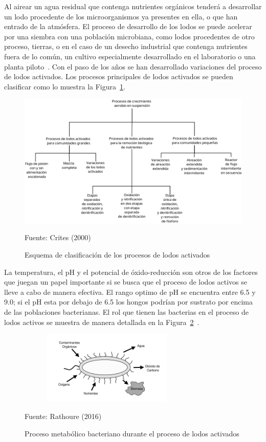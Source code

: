 Al airear un agua residual que contenga nutrientes orgánicos tenderá a desarrollar un lodo procedente de los microorganismos ya presentes en ella, o que han entrado de la atmósfera. El proceso de desarrollo de los lodos se puede acelerar por una siembra con una población microbiana, como lodos procedentes de otro proceso, tierras, o en el caso de un desecho industrial que contenga nutrientes fuera de lo común, un cultivo especialmente desarrollado en el laboratorio o una planta piloto~\emph{\citep{winkler96}}.
Con el paso de los años se han desarrollado variaciones del proceso de lodos activados. Los procesos principales de lodos activados se pueden clasificar como lo muestra la Figura~\ref{fig:procesosaer}.\\
	\begin{figure}[!h]
		\centering
		\includegraphics[scale=0.2]{Clasificacion_procesos_aer.png}
		\caption{Esquema de clasificación de los procesos de lodos activados}
		\small{Fuente: Crites (2000)}
		\label{fig:procesosaer}
	\end{figure}
La temperatura, el pH y el potencial de óxido-reducción son otros de los factores que juegan un papel importante si se busca que el proceso de lodos activos se lleve a cabo de manera efectiva. El rango optimo de pH se encuentra entre 6.5 y 9.0; si el pH esta por debajo de 6.5 los hongos podrían por sustrato por encima de las poblaciones bacterianas. El rol que tienen las bacterias en el proceso de lodos activos se muestra de manera detallada en la Figura~\ref{fig:rolbacteria}~\emph{\citep{ashok16, winkler96}}.
	\begin{figure}[h]
		\centering
		\includegraphics[height=3.5cm,width=8.5cm]{Bacteria_rol.png}
		\caption{Proceso metabólico bacteriano durante el proceso de lodos activados}
		\small{Fuente: Rathoure (2016)}
		\label{fig:rolbacteria}
	\end{figure}
